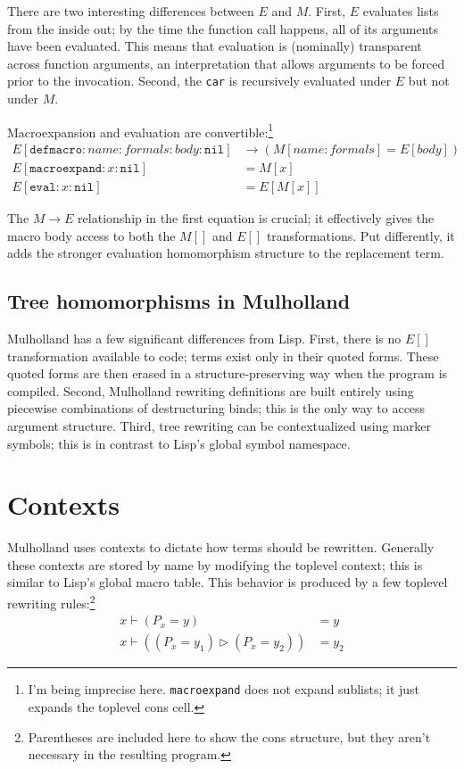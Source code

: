 \documentclass{report}
\def\rewrite {\vdash}
\begin{document}
    There are two interesting differences between $E$ and $M$. First, $E$ evaluates lists from the inside out; by the time the function call happens, all of its arguments have been evaluated.
    This means that evaluation is (nominally) transparent across function arguments, an interpretation that allows arguments to be forced prior to the invocation. Second, the {\tt car} is
    recursively evaluated under $E$ but not under $M$.

    Macroexpansion and evaluation are convertible:\footnote{I'm being imprecise here. {\tt macroexpand} does not expand sublists; it just expands the toplevel cons cell.}
\begin{align*}
E[\texttt{defmacro}:name:formals:body:\texttt{nil}] & \rightarrow (M[name:formals] = E[body]) \\
E[\texttt{macroexpand}:x:\texttt{nil}]              & = M[x] \\
E[\texttt{eval}:x:\texttt{nil}]                     & = E[M[x]]
\end{align*}

    The $M \rightarrow E$ relationship in the first equation is crucial; it effectively gives the macro body access to both the $M[]$ and $E[]$ transformations. Put differently, it adds the
    stronger evaluation homomorphism structure to the replacement term.

\section{Tree homomorphisms in Mulholland}
    Mulholland has a few significant differences from Lisp. First, there is no $E[]$ transformation available to code; terms exist only in their quoted forms. These quoted forms are then
    erased in a structure-preserving way when the program is compiled. Second, Mulholland rewriting definitions are built entirely using piecewise combinations of destructuring binds; this is
    the only way to access argument structure. Third, tree rewriting can be contextualized using marker symbols; this is in contrast to Lisp's global symbol namespace.

\chapter{Contexts}
  Mulholland uses contexts to dictate how terms should be rewritten. Generally these contexts are stored by name by modifying the toplevel context; this is similar to Lisp's global macro
  table. This behavior is produced by a few toplevel rewriting rules:\footnote{Parentheses are included here to show the cons structure, but they aren't necessary in the resulting program.}
\begin{align*}
x \rewrite (P_x = y)                      & = y \\
x \rewrite ((P_x = y_1) \rhd (P_x = y_2)) & = y_2
\end{align*}
\end{document}
